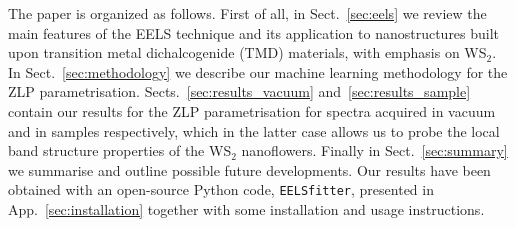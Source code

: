 The paper is organized as follows.
%
First of all, in Sect.~\ref{sec:eels}
we review the main features of the EELS technique
and its application to nanostructures built upon transition metal
dichalcogenide (TMD) materials, with emphasis on WS$_2$.
%
In Sect.~\ref{sec:methodology} we describe our machine learning methodology
for the ZLP parametrisation.
%
Sects.~\ref{sec:results_vacuum} and~\ref{sec:results_sample} contain
our results for the ZLP parametrisation for spectra acquired
in vacuum and in samples respectively, which in the latter
case allows us to probe the local band structure properties
of the WS$_2$ nanoflowers.
%
Finally in Sect.~\ref{sec:summary} we summarise
and outline possible future developments.
%
Our results have been obtained with an open-source {\sc Python} code,
{\tt EELSfitter}, presented in App.~\ref{sec:installation}
together with some installation and usage instructions.
